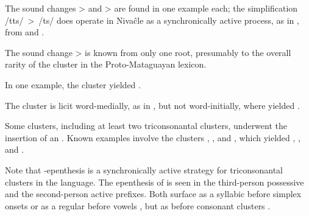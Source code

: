 \begin{exe}
    \ex \smelln
    \ex \cavy
\end{exe}

The sound changes  >  and  >  are found in one example each; the simplification /tts/~>~/ts/ does operate in Nivaĉle as a synchronically active process, as in , from  and  \citep[294]{JS16}.

\begin{exe}
    \ex \welln
    \ex \willow
\end{exe}

The sound change  >  is known from only one root, presumably to the overall rarity of the cluster  in the Proto-Mataguayan lexicon.

\begin{exe}
    \ex \spousewh
    \ex \marry
\end{exe}

In one example, the cluster  yielded .

\begin{exe}
    \ex \moon
\end{exe}

The cluster  is licit word-medially, as in , but not word-initially, where  yielded .

\begin{exe}
    \ex \skunk
\end{exe}

Some clusters, including at least two triconsonantal clusters, underwent the insertion of an . Known examples involve the clusters , , and , which yielded , , and .

\begin{exe}
    \ex \cavy
    \ex \kingvulture
    \ex \blind
\end{exe}

Note that -epenthesis is a synchronically active strategy for triconsonantal clusters in the language. The epenthesis of  is seen in the third-person possessive and the second-person active prefixes. Both surface as a syllabic  before simplex onsets  or as a regular  before vowels , but as  before consonant clusters  \citep[59, 62, 230--231]{AnG15}.

